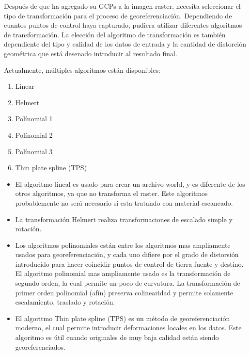 \label{georeferencer_transformation}

Después de que ha agregado su GCPs a la imagen raster, necesita seleccionar el tipo de transformación para el proceso de georeferenciación. Dependiendo de cuantos puntos de control haya capturado, pudiera utilizar diferentes algoritmos de transformación. La elección del algoritmo de transformación es también dependiente del tipo y calidad de los datos de entrada y la cantidad de distorción geométrica que está desenado introducir al resultado final.

Actualmente, múltiples algoritmos están disponibles:

\begin{enumerate}
\item Linear
\item Helmert
\item Polínomial 1
\item Polínomial 2
\item Polínomial 3
\item Thin plate spline (TPS)
\end{enumerate}

\begin{itemize}
\item El algoritmo lineal es usado para crear un archivo world, y es diferente de los otros algoritmos, ya que no transforma el raster. Este algoritmos probablemente no será necesario si esta tratando con material escaneado.
\item La transformación Helmert realiza transformaciones de escalado simple y rotación. 
\item Los algoritmos polinomiales están entre los algoritmos mas ampliamente usados para georeferenciación, y cada uno difiere por el grado de distorsión introducido para hacer coincidir puntos de control de tierra fuente y destino. El algoritmo polinomial mas ampliamente usado es la transformación de segundo orden, la cual permite un poco de curvatura. La transformación de primer orden polinomial (afín) preserva colinearidad y permite solamente escalamiento, traslado y rotación.
\item El algoritmo Thin plate spline (TPS) es un método de georeferenciación moderno, el cual permite introducir deformaciones locales en los datos. Este algoritmo es útil cuando originales de muy baja calidad están siendo georeferenciados.
\end{itemize}

\label{georeferencer_running}

